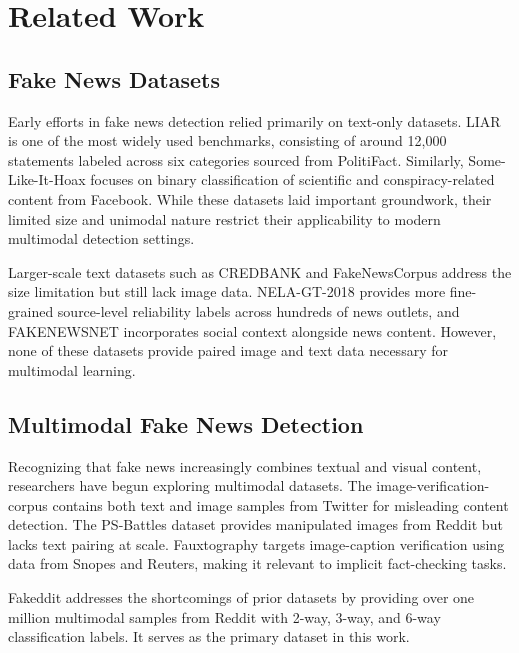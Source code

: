 \section{Related Work}

\subsection{Fake News Datasets}

Early efforts in fake news detection relied primarily on text-only datasets. LIAR \cite{wang-2017} is one of the most widely used benchmarks, consisting of around 12,000 statements labeled across six categories sourced from PolitiFact. Similarly, Some-Like-It-Hoax \cite{tacchini-2017} focuses on binary classification of scientific and conspiracy-related content from Facebook. While these datasets laid important groundwork, their limited size and unimodal nature restrict their applicability to modern multimodal detection settings.

Larger-scale text datasets such as CREDBANK \cite{mitra-2015} and FakeNewsCorpus address the size limitation but still lack image data. NELA-GT-2018 \cite{norregaard-2019} provides more fine-grained source-level reliability labels across hundreds of news outlets, and FAKENEWSNET \cite{shu-2018} incorporates social context alongside news content. However, none of these datasets provide paired image and text data necessary for multimodal learning.

\subsection{Multimodal Fake News Detection}

Recognizing that fake news increasingly combines textual and visual content, researchers have begun exploring multimodal datasets. The image-verification-corpus \cite{boididou-2017} contains both text and image samples from Twitter for misleading content detection. The PS-Battles dataset \cite{heller-2018} provides manipulated images from Reddit but lacks text pairing at scale. Fauxtography \cite{zlatkova-2019} targets image-caption verification using data from Snopes and Reuters, making it relevant to implicit fact-checking tasks.

Fakeddit \cite{fakeddit} addresses the shortcomings of prior datasets by providing over one million multimodal samples from Reddit with 2-way, 3-way, and 6-way classification labels. It serves as the primary dataset in this work.

